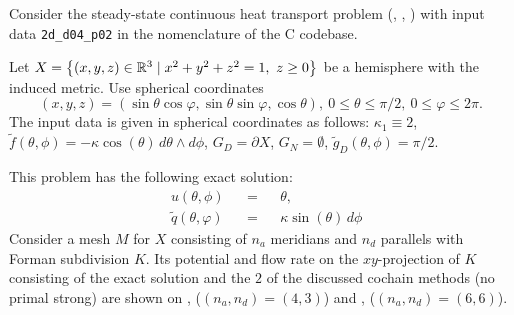 \begin{example}
  \label{idec/diffusion/continuous/steady_state/examples/2d_d04_p02-example}
  Consider the steady-state continuous heat transport problem
  (,
   ,
   )
  with input data \verb|2d_d04_p02| in the nomenclature of the C codebase.

  Let $X = \left\{ (x, y, z) \in \mathbb{R}^3 \mid x^2 + y^2 + z^2 = 1,\ z \geq 0 \right\}$ be a
  hemisphere with the induced metric.
  Use spherical coordinates
  \begin{equation}
    (x, y, z)
    = (\sin \theta \cos \varphi, \sin \theta \sin \varphi, \cos \theta),\
    0 \leq \theta \leq \pi / 2,\
    0 \leq \varphi \leq 2 \pi.
  \end{equation}
  The input data is given in spherical coordinates as follows:
    $\kappa_1 \equiv 2$,
    $\tilde{f}(\theta, \phi) = - \kappa \cos(\theta)\, d \theta \wedge d \phi$,
    $G_D = \partial X$,
    $G_N = \emptyset$,
    $\tilde{g}_D(\theta, \phi) = \pi / 2$.

  This problem has the following exact solution:
  \begin{subequations}
    \begin{alignat}{3}
      & u(\theta, \phi) && = && \theta, \\
      & \tilde{q}(\theta, \varphi) && = && \kappa \sin(\theta)\, d \phi
    \end{alignat}
  \end{subequations}
  Consider a mesh $M$ for $X$ consisting of $n_a$ meridians and $n_d$ parallels
  with Forman subdivision $K$.
  Its potential and flow rate on the $xy$-projection of $K$ consisting of the
  exact solution and the $2$ of the discussed cochain methods (no primal strong)
  are shown on
  ,
  ($(n_a, n_d) = (4, 3)$)
  and
  ,
  ($(n_a, n_d) = (6, 6)$).
\end{example}
